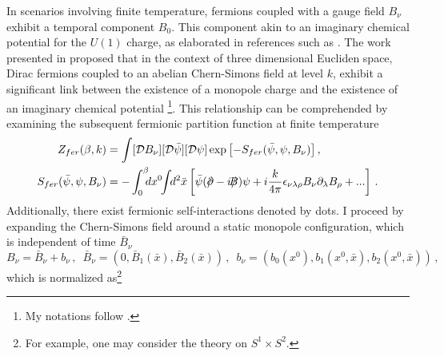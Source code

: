 \documentclass[twoside]{article}
\begin{document}
In scenarios involving finite temperature, fermions coupled with a gauge field $B_\nu$ exhibit a temporal component $B_0$. This component akin to an imaginary chemical potential for the $U(1)$ charge, as elaborated in references such as \cite{ZinnJustin:2002ru}.  The work presented in \cite{Filothodoros:2016txa} proposed that in the context of three dimensional Eucliden space, Dirac fermions coupled to an abelian Chern-Simons field at level $k$, exhibit a significant link between the existence of a monopole charge and the existence of an imaginary chemical potential \footnote{My notations follow \cite{ZinnJustin:2002ru}.}. This relationship can be comprehended by examining the subsequent fermionic partition function at finite temperature
\begin{align}
\label{DiracCSPF}
Z_{fer}(\beta,k)&=\int [{\cal D}B_\nu][{\cal D}\bar\psi][{\cal D}\psi]\exp{\left[-S_{fer}(\bar\psi,\psi,B_\nu)\right]}\,,\\
\label{Sf}
S_{fer}(\bar\psi,\psi,B_\nu)&=-\int_0^{\beta}\!\!\!dx^0\!\!\int \!\!d^2\bar{x}\left[\bar{\psi}(\slash\!\!\!\partial -i\slash\!\!\!\!B)\psi+i\frac{k}{4\pi}\epsilon_{\nu\lambda\rho}B_\nu\partial_\lambda B_\rho+...\right]\,.
\end{align}
Additionally, there exist fermionic self-interactions denoted by dots. I proceed by expanding the Chern-Simons field around a static monopole configuration, which is independent of time $\bar{B}_\nu$ \cite{Fosco:1998cq}
\begin{equation}
\label{Aexpansion}
B_\nu=\bar{B}_\nu+ b_\nu\,,\,\,\,\bar{B}_\nu=(0,\bar{B}_1(\bar{x}),\bar{B}_2(\bar{x}))\,,\,\,\, b_\nu=(b_0(x^0),b_1(x^0,\bar{x}),b_2(x^0,\bar{x}))\,,
\end{equation}
which is normalized as\footnote{For example, one may consider the theory on $S^1\times S^2$.}
\end{document}
